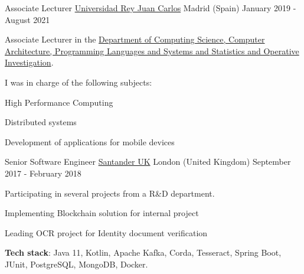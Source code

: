 \begin{cventries}
  \cventry
    {Associate Lecturer} %
    {\href{https://www.urjc.es}{Universidad Rey Juan Carlos}} %
    {Madrid (Spain)} %
    {January 2019 - August 2021} %
    {
      \begin{cvitems}%
        \item[] Associate Lecturer in the \href{https://gestion2.urjc.es/pdi/departamento/Y157}{Department of Computing Science, Computer Architecture, Programming Languages and Systems and Statistics and Operative Investigation}.
        \item[]
        \item[] I was in charge of the following subjects:
        \item[] 
        \item {High Performance Computing}
        \item {Distributed systems}
        \item {Development of applications for mobile devices}
      \end{cvitems}
    }


  \cventry
    {Senior Software Engineer} %
    {\href{https://www.santander.co.uk}{Santander UK}} %
    {London (United Kingdom)} %
    {September 2017 - February 2018} %
    {
      \begin{cvitems}%
        \item[] Participating in several projects from a R\&D department.
        \item[]
        \item {Implementing Blockchain solution for internal project}
        \item {Leading OCR project for Identity document verification}
        \item[] 
        \item[]\textbf{Tech stack}: Java 11, Kotlin, Apache Kafka, Corda, Tesseract, Spring Boot, JUnit, PostgreSQL, MongoDB, Docker.
      \end{cvitems}
    }
    


\end{cventries}
